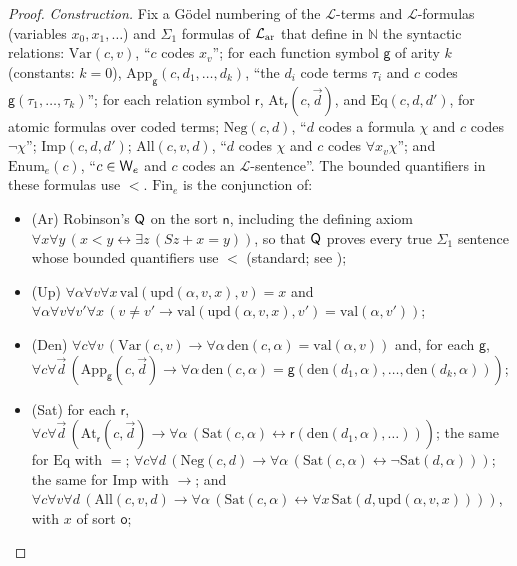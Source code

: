 \begin{proof}
\emph{Construction.} Fix a Gödel numbering of the $\mathcal L$-terms and $\mathcal L$-formulas (variables $x_0,x_1,\dots$) and $\Sigma_1$ formulas of $\mathcal{L}_{\mathrm{ar}}$ that define in $\mathbb N$ the syntactic relations: $\mathrm{Var}(c,v)$, ``$c$ codes $x_v$''; for each function symbol $\mathsf g$ of arity $k$ (constants: $k=0$), $\mathrm{App}_{\mathsf g}(c,d_1,\dots,d_k)$, ``the $d_i$ code terms $\tau_i$ and $c$ codes $\mathsf g(\tau_1,\dots,\tau_k)$''; for each relation symbol $\mathsf r$, $\mathrm{At}_{\mathsf r}(c,\vec d)$, and $\mathrm{Eq}(c,d,d')$, for atomic formulas over coded terms; $\mathrm{Neg}(c,d)$, ``$d$ codes a formula $\chi$ and $c$ codes $\neg\chi$''; $\mathrm{Imp}(c,d,d')$; $\mathrm{All}(c,v,d)$, ``$d$ codes $\chi$ and $c$ codes $\forall x_v\chi$''; and $\mathrm{Enum}_e(c)$, ``$c\in\mathsf{W}_{e}$ and $c$ codes an $\mathcal L$-sentence''. The bounded quantifiers in these formulas use $<$. $\mathrm{Fin}_e$ is the conjunction of:
\begin{itemize}[leftmargin=*]
\item (Ar) Robinson's $\mathsf{Q}$ on the sort $\mathsf n$, including the defining axiom $\forall x\forall y\,(x<y\leftrightarrow\exists z\,(Sz+x=y))$, so that $\mathsf{Q}$ proves every true $\Sigma_1$ sentence whose bounded quantifiers use $<$ (standard; see \citealp{boolos2007computability});
\item (Up) $\forall\alpha\forall v\forall x\,\mathrm{val}(\mathrm{upd}(\alpha,v,x),v)=x$ and $\forall\alpha\forall v\forall v'\forall x\,(v\ne v'\to\mathrm{val}(\mathrm{upd}(\alpha,v,x),v')=\mathrm{val}(\alpha,v'))$;
\item (Den) $\forall c\forall v\,(\mathrm{Var}(c,v)\to\forall\alpha\,\mathrm{den}(c,\alpha)=\mathrm{val}(\alpha,v))$ and, for each $\mathsf g$, $\forall c\forall\vec d\,(\mathrm{App}_{\mathsf g}(c,\vec d)\to\forall\alpha\,\mathrm{den}(c,\alpha)=\mathsf g(\mathrm{den}(d_1,\alpha),\dots,\mathrm{den}(d_k,\alpha)))$;
\item (Sat) for each $\mathsf r$, $\forall c\forall\vec d\,(\mathrm{At}_{\mathsf r}(c,\vec d)\to\forall\alpha\,(\mathrm{Sat}(c,\alpha)\leftrightarrow\mathsf r(\mathrm{den}(d_1,\alpha),\dots)))$; the same for $\mathrm{Eq}$ with $=$; $\forall c\forall d\,(\mathrm{Neg}(c,d)\to\forall\alpha\,(\mathrm{Sat}(c,\alpha)\leftrightarrow\neg\mathrm{Sat}(d,\alpha)))$; the same for $\mathrm{Imp}$ with $\to$; and $\forall c\forall v\forall d\,(\mathrm{All}(c,v,d)\to\forall\alpha\,(\mathrm{Sat}(c,\alpha)\leftrightarrow\forall x\,\mathrm{Sat}(d,\mathrm{upd}(\alpha,v,x))))$, with $x$ of sort $\mathsf o$;

\end{itemize}
\end{proof}
